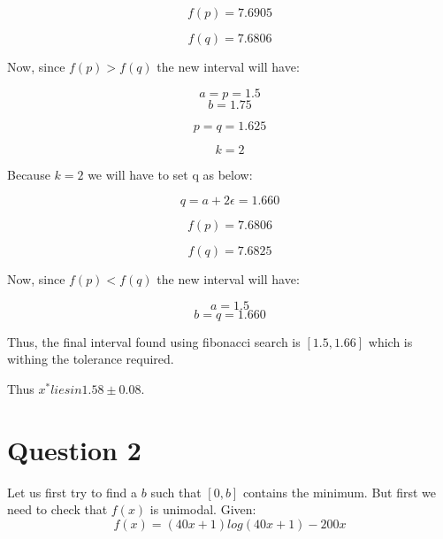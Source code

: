 \documentclass[a4paper]{article}
\begin{document}
\begin{equation}
f(p) = 7.6905   
\end{equation}   

\begin{equation}
f(q) =  7.6806
\end{equation}

Now, since $f(p) > f(q)$ the new interval will have:

\begin{equation}
a = p = 1.5
\end{equation}
\begin{equation}
b = 1.75
\end{equation}

\begin{equation}
p  = q = 1.625
\end{equation}


\begin{equation}
k = 2
\end{equation}

Because $k = 2$ we will have to set q as below:

\begin{equation}
q = a + 2\epsilon = 1.660
\end{equation}

\begin{equation}
f(p) = 7.6806    
\end{equation}

\begin{equation}
f(q) = 7.6825
\end{equation}

Now, since $f(p) < f(q)$ the new interval will have:

\begin{equation}
a = 1.5
\end{equation}
\begin{equation}
b = q = 1.660
\end{equation}

Thus, the final interval found using fibonacci search is $[1.5, 1.66]$ which is withing the tolerance required. 

Thus $x^* lies in 1.58 \pm 0.08$.

\section*{Question 2}

Let us first try to find a $b$ such that $[0, b]$ contains the minimum. But first we need to check that $f(x)$ is unimodal.
Given:
\begin{equation}
f(x) = (40x+1) log(40x+1)−200x
\end{equation}
\end{document}

